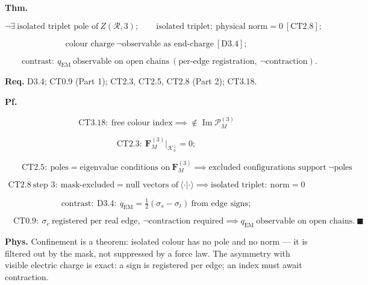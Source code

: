 \begin{theorem}\label{tag:CT3-22}
\textbf{Thm.}

\[
\neg\exists\ \text{isolated triplet pole of}\ Z(\mathcal R,3);\qquad
\text{isolated triplet}:\ \text{physical norm}=0\ [\mathrm{CT2.8}];
\]

\[
\text{colour charge}\ \neg\text{observable as end-charge}\ [\mathrm{D3.4}];
\]

\[
\qquad \text{contrast}:\ q_{\mathrm{EM}}\ \text{observable on open chains}\ (\text{per-edge registration},\ \neg\text{contraction}).
\]

\textbf{Req.} D3.4; CT0.9 (Part 1); CT2.3, CT2.5, CT2.8 (Part 2); CT3.18.

\textbf{Pf.}

\[
\mathrm{CT3.18}:\ \text{free colour index}\implies\notin\operatorname{Im}\mathcal P_M^{(3)}
\]

\[
\mathrm{CT2.3}:\ \mathbf F_M^{(3)}\big|_{\mathcal K_3^\perp}=0;
\]

\[
\qquad \mathrm{CT2.5}:\ \text{poles}=\text{eigenvalue conditions on}\ \mathbf F_M^{(3)}\implies\text{excluded configurations support}\ \neg\text{poles}
\]

\[
\mathrm{CT2.8}\ \text{step 3}:\ \text{mask-excluded}=\text{null vectors of}\ \langle\cdot|\cdot\rangle\implies\text{isolated triplet}:\ \text{norm}=0
\]

\[
\text{contrast}:\ \mathrm{D3.4}:\ q_{\mathrm{EM}}=\tfrac12(\sigma_s-\sigma_t)\ \text{from edge signs};
\]

\[
\quad \mathrm{CT0.9}:\ \sigma_e\ \text{registered per real edge},\ \neg\text{contraction required}\implies q_{\mathrm{EM}}\ \text{observable on open chains}.\ \blacksquare
\]

\textbf{Phys.} Confinement is a theorem: isolated colour has no pole and no norm — it is filtered out by the mask, not suppressed by a force law. The asymmetry with visible electric charge is exact: a sign is registered per edge; an index must await contraction.

\end{theorem}

